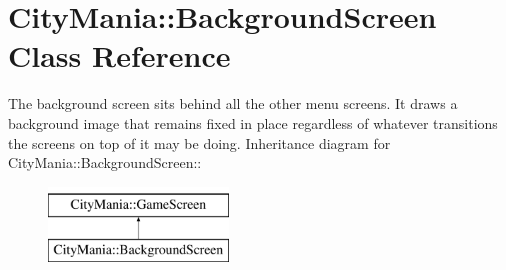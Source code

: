 \hypertarget{classCityMania_1_1BackgroundScreen}{
\section{CityMania::BackgroundScreen Class Reference}
\label{classCityMania_1_1BackgroundScreen}
}


The background screen sits behind all the other menu screens. It draws a background image that remains fixed in place regardless of whatever transitions the screens on top of it may be doing.  
Inheritance diagram for CityMania::BackgroundScreen::\begin{figure}[H]
\begin{center}
\leavevmode
\includegraphics[height=2cm]{classCityMania_1_1BackgroundScreen}
\end{center}
\end{figure}
